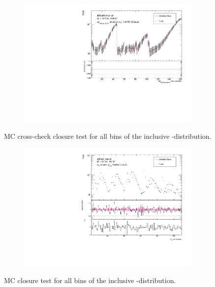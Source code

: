 \begin{figure}[htb]
  \centering
  \begin{subfigure}{.65\textwidth}\centering\includegraphics[width = 0.99\textwidth]{Figures/m4l/UnfoldingStudies/v014_closure/FullMCClosure_deltaPhiLeadingLeptons_m4l.pdf}\end{subfigure}
\caption{MC cross-check closure test for all bins of the inclusive \dPhill-\mFourL distribution.\label{fig:dphiclos}}
 \end{figure}

\begin{figure}[htb]
  \centering
  \begin{subfigure}{.65\textwidth}\centering\includegraphics[width = 0.99\textwidth]{Figures/m4l/UnfoldingStudies/v014_closure/HalfMCClosure_withPull_m4l_pt4l.pdf}\end{subfigure}
\caption{MC closure test for all bins of the inclusive \mFourL-\ptFourL distribution.\label{fig:pt4lhalf}}
 \end{figure}

